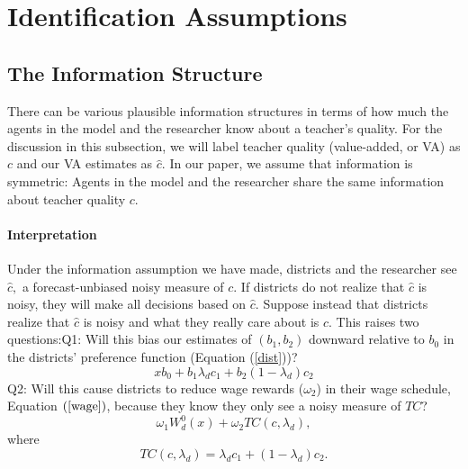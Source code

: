 \documentclass[notitlepage,12pt]{article}%
\begin{document}
\section{Identification Assumptions}
\label{sec:id_assumptions}
\subsection{The Information Structure}

There can be various plausible information structures in terms of how much the
agents in the model and the researcher know about a teacher's quality. For the
discussion in this subsection, we will label teacher quality (value-added, or VA) as
$c$ and our VA estimates as $\widehat{c}.$ In our paper, we assume that information is symmetric: Agents in the model and the
researcher share the same information about teacher quality $c$. 

\paragraph{Interpretation}

Under the information assumption we have made, districts and the researcher see $\widehat{c},$ a forecast-unbiased noisy measure of $c$. If districts do not realize that $\widehat{c}$ is noisy, they will make all
decisions based on $\widehat{c}$. Suppose instead that districts realize that
$\widehat{c}$ is noisy and what they really care about is $c$. This raises two questions:\newline Q1: Will this
bias our estimates of $\left(  b_{1},b_{2}\right)  $ downward relative to
$b_{0}$ in the districts' preference function (Equation (\ref{dist}))? 
\begin{equation}
xb_{0}+b_{1}\lambda_{d}c_{1}+b_{2}\left(  1-\lambda_{d}\right)  c_{2}
\label{dist}%
\end{equation}
\newline Q2: Will this cause districts to reduce wage rewards ($\omega_{2}$)
in their wage schedule, Equation $\left(  \ref{wage}\right)  $, because they
know they only see a noisy measure of $TC$?
\begin{equation}
\omega_{1}W_{d}^{0}\left(  x\right)  +\omega_{2}TC\left(  c,\lambda
_{d}\right)  , \label{wage}%
\end{equation}
where
\begin{equation}
TC\left(  c,\lambda_{d}\right)  =\lambda_{d}c_{1}+\left(  1-\lambda
_{d}\right)  c_{2}. \label{TC}%
\end{equation}
\end{document}
